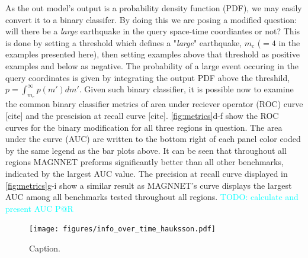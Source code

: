 \documentclass[pdflatex]{sn-jnl}
\newcommand{\neri}[1]{{\textcolor{cyan}{#1}}}
\begin{document}
As the out model's output is a probability density function (PDF), we may easily convert it to a binary classifer. By doing this we are posing a modified question: will there be a \textit{large} earthquake in the query space-time coordiantes or not? This is done by setting a threshold which defines a "\textit{large}" earthquake, $m_c$ ($=4$ in the examples presented here), then setting examples above that threshold as positive examples and below as negative. The probability of a large event occuring in the query coordinates is given by integrating the output PDF above the threshild, $p=\int_{m_c}^{\infty}p(m')dm'$. Given such binary classifier, it is possible now to examine the common binary classifier metrics of area under reciever operator (ROC) curve [cite] and the prescision at recall curve [cite]. \ref{fig:metrics}d-f show the ROC curves for the binary modification for all three regions in question. The area under the curve (AUC) are written to the bottom right of each panel color coded by the same legend as the bar plots above. It can be seen that throughout all regions MAGNNET preforms significantly better than all other benchmarks, indicated by the largest AUC value. The precision at recall curve displayed in \ref{fig:metrics}g-i show a similar result as MAGNNET's curve displays the largest AUC among all benchmarks tested throughout all regions.
\neri{TODO: calculate and present AUC P@R}

   
    
\begin{figure}[h!]
    \centering
    \texttt{[image: figures/info\_over\_time\_hauksson.pdf]}
    \caption{
        Caption.
    }
    \label{fig:info_gain_over_time}
\end{figure}
    
\end{document}
